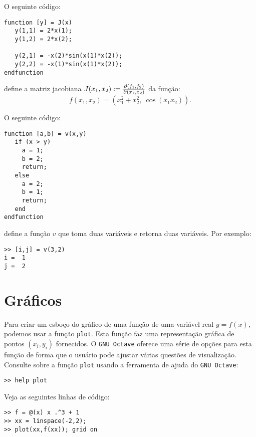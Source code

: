 \begin{ex}
  O seguinte código:
\begin{verbatim}
function [y] = J(x)
   y(1,1) = 2*x(1);
   y(1,2) = 2*x(2);

   y(2,1) = -x(2)*sin(x(1)*x(2));
   y(2,2) = -x(1)*sin(x(1)*x(2));
endfunction
\end{verbatim}
define a matriz jacobiana $J(x_1,x_2) := \frac{\partial(f_1,f_2)}{\partial(x_1,x_2)}$ da função:
\begin{equation}
  f(x_1,x_2) = (x_1^2 + x_2^2,~\cos(x_1x_2)).
\end{equation}
\end{ex}

\begin{ex}
  O seguinte código:
\begin{verbatim}
function [a,b] = v(x,y)
   if (x > y)
     a = 1;
     b = 2;
     return;
   else
     a = 2;
     b = 1;
     return;
   end
endfunction
\end{verbatim}
define a função $v$ que toma duas variáveis e retorna duas variáveis. Por exemplo:
\begin{verbatim}
>> [i,j] = v(3,2)
i =  1
j =  2
\end{verbatim}
\end{ex}

\section{Gráficos}

Para criar um esboço do gráfico de uma função de uma variável real $y = f(x)$, podemos usar a função \verb+plot+. Esta função faz uma representação gráfica de pontos $(x_i, y_i)$ fornecidos. O \verb+GNU Octave+ oferece uma série de opções para esta função de forma que o usuário pode ajustar várias questões de visualização. Consulte sobre a função \verb+plot+ usando a ferramenta de ajuda do \verb+GNU Octave+:
\begin{verbatim}
>> help plot
\end{verbatim}

\begin{ex}
  Veja as seguintes linhas de código:
\begin{verbatim}
>> f = @(x) x .^3 + 1
>> xx = linspace(-2,2);
>> plot(xx,f(xx)); grid on
\end{verbatim}
\end{ex}
